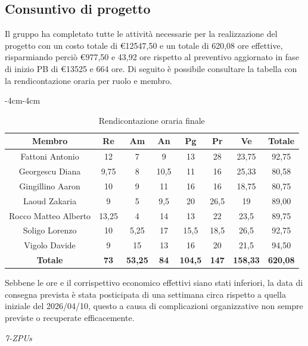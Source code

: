 \documentclass[a4paper,12pt]{article}
\begin{document}
\subsection{Consuntivo di progetto}
Il gruppo ha completato tutte le attività necessarie per la realizzazione del progetto con un costo totale di €12547,50 e un totale di 620,08 ore effettive, risparmiando perciò €977,50 e 43,92 ore rispetto al preventivo aggiornato in fase di inizio PB di €13525 e 664 ore.
Di seguito è possibile consultare la tabella con la rendicontazione oraria per ruolo e membro.

\begin{table}[H]
    \begin{adjustwidth}{-4cm}{-4cm}
    \centering
    \begin{tabular}{|c|c|c|c|c|c|c|c|}
    \hline
        \rowcolor{zpusgreen!30}
        \textbf{Membro} & \textbf{Re} & \textbf{Am} & \textbf{An} & \textbf{Pg} & \textbf{Pr} & \textbf{Ve} & \textbf{Totale} \\
        \hline
        Fattoni Antonio         & 12        & 7         & 9             & 13            & 28           & 23,75     & 92,75 \\
        \hline
        Georgescu Diana         & 9,75      & 8         & 10,5          & 11            & 16           & 25,33     & 80,58 \\
        \hline
        Gingillino Aaron        & 10        & 9         & 11            & 16            & 16           & 18,75     & 80,75 \\
        \hline
        Laoud Zakaria           & 9         & 5         & 9,5           & 20            & 26,5         & 19        & 89,00 \\
        \hline
        Rocco Matteo Alberto    & 13,25     & 4         & 14            & 13            & 22           & 23,5     & 89,75 \\
        \hline
        Soligo Lorenzo          & 10        & 5,25      & 17            & 15,5          & 18,5         & 26,5     & 92,75 \\
        \hline
        Vigolo Davide           & 9         & 15        & 13            & 16            & 20           & 21,5      & 94,50 \\
        \hline
        \textbf{Totale} & \textbf{73} & \textbf{53,25} & \textbf{84} & \textbf{104,5} & \textbf{147} & \textbf{158,33} & \textbf{620,08} \\
        \hline
    \end{tabular}
    \caption{Rendicontazione oraria finale}
    \end{adjustwidth}
\end{table}

Sebbene le ore e il corrispettivo economico effettivi siano stati inferiori, la data di consegna prevista è stata posticipata di una settimana circa rispetto a quella iniziale del 2026/04/10, questo a causa di complicazioni organizzative non sempre previste o recuperate efficacemente.

\vfill
\begin{flushright}
    \textit{7-ZPUs}
\end{flushright}
\end{document}
